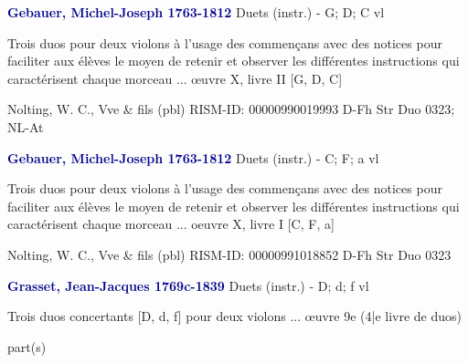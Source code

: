 \documentclass[twocolumn]{book}
\begin{document}
\newline \par \vspace{7pt} \textcolor{darkblue}{\textbf{Gebauer, Michel-Joseph  1763-1812}}
\newline Duets (instr.) - G; D; C
 vl
\newline \begin{itshape}Trois duos pour deux violons à l'usage des commençans avec des notices pour faciliter aux élèves le moyen de retenir et observer les différentes instructions qui caractérisent chaque morceau ... œuvre X, livre II [G, D, C]\end{itshape} 
\newline Nolting, W. C., Vve \& fils  (pbl)
\newline RISM-ID: 00000990019993
\newline D-Fh  Str Duo 0323; NL-At
\newline \par \vspace{7pt} \textcolor{darkblue}{\textbf{Gebauer, Michel-Joseph  1763-1812}}
\newline Duets (instr.) - C; F; a
 vl
\newline \begin{itshape}Trois duos pour deux violons à l'usage des commençans avec des notices pour faciliter aux élèves le moyen de retenir et observer les différentes instructions qui caractérisent chaque morceau ... oeuvre X, livre I [C, F, a]\end{itshape} 
\newline Nolting, W. C., Vve \& fils  (pbl)
\newline RISM-ID: 00000991018852
\newline D-Fh  Str Duo 0323
\newline \par \vspace{7pt} \textcolor{darkblue}{\textbf{Grasset, Jean-Jacques  1769c-1839}}
\newline Duets (instr.) - D; d; f
 vl
\newline \begin{itshape}Trois duos concertants [D, d, f] pour deux violons ... œuvre 9e (4|e livre de duos)\end{itshape} 
\newline \textcolor{darkblue}{}  part(s)
\end{document}
